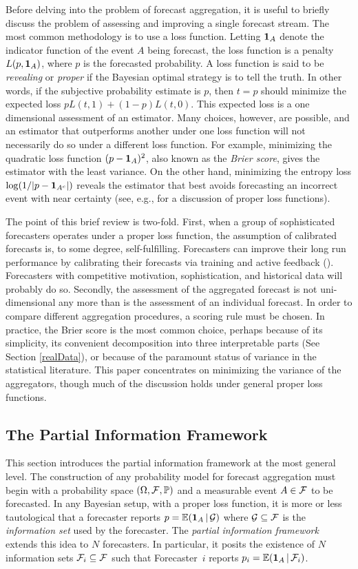 \documentclass[11pt]{article}
\renewcommand{\P}{\mathbb{P}}
\newcommand{\E}{\mathbb{E}}
\theoremstyle{definition}
\theoremstyle{definition}
\def\one{{\bf 1}}
\def\F{{\cal F}}
\def\G{{\cal G}}
\def\P{{\mathbb P}}
\def\E{{\mathbb E}}
\def\|{\, | \,}
\begin{document}
Before delving into the problem of forecast aggregation, it is useful
to briefly discuss the problem of assessing and improving a single
forecast stream.  The most common methodology is to use a loss
function.  Letting $\one_A$ denote the indicator function of the event
$A$ being forecast, the loss function is a penalty $L(p , \one_A)$,
where $p$ is the forecasted probability.  A loss function is said to
be {\em revealing} or {\em proper} if the Bayesian optimal strategy is
to tell the truth.  In other words, if the subjective probability
estimate is $p$, then $t = p$ should minimize the expected loss $p
L(t,1) + (1-p) L(t,0)$.  This expected loss is a one dimensional
assessment of an estimator. Many choices, however, are possible, and
an estimator that outperforms another under one loss function will not
necessarily do so under a different loss function.  For example,
minimizing the quadratic loss function $(p - \one_A)^2$, also known as
the {\em Brier score}, gives the estimator with the least variance. On
the other hand, minimizing the entropy loss $\log (1 / |p -
\one_{A^c}|)$ reveals the estimator that best avoids forecasting an
incorrect event with near certainty (see, e.g., \citealt[Section~2]{HwPe1997}
for a discussion of proper loss functions).

The point of this brief review is two-fold.  First, when a group of
sophisticated forecasters operates under a proper loss function,
the assumption of calibrated forecasts is, to some degree,
self-fulfilling.  Forecasters can improve their long run performance
by calibrating their forecasts via training and active
feedback (\citealt{o2006uncertain}). Forecasters with competitive
motivation, sophistication, and historical data will probably do so. Secondly, the
assessment of the aggregated forecast is not uni-dimensional any more
than is the assessment of an individual forecast.  In order to compare
different aggregation procedures, a scoring rule must be chosen.  In
practice, the Brier score is the most common choice, perhaps because
of its simplicity, its convenient decomposition into three
interpretable parts (See Section \ref{realData}), or because of the
paramount status of variance in the statistical literature. This paper concentrates on minimizing the variance of the aggregators, though
 much of the discussion holds under general proper loss
functions.

\subsection{The Partial Information Framework}
\label{PIFintro}
This section introduces the partial information framework at the most general level. The construction of any probability model for forecast aggregation must begin with
 a probability space $(\Omega, \F , \P)$ and a
measurable event $A \in \F$ to be forecasted.  In any Bayesian setup,
with a proper loss function, it is more or less tautological that a
forecaster reports $p = \E (\one_A \| \G)$ where $\G \subseteq \F$ is
the \textit{information set} used by the forecaster.  The
\textit{partial information framework} extends this idea to $N$
forecasters. In particular, it posits the existence of $N$
information sets $\F_i \subseteq \F$ such that Forecaster~$i$
reports $p_i = \E (\one_A \| \F_i)$.
\end{document}
